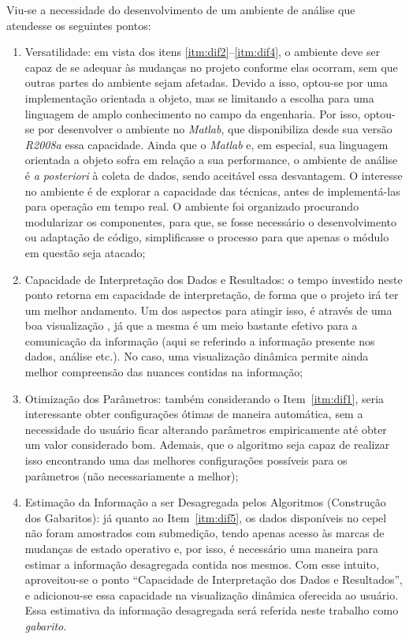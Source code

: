 Viu-se a necessidade do
desenvolvimento de um ambiente de análise que atendesse os seguintes
pontos:

\begin{enumerate}
\item Versatilidade: em vista dos itens
\ref{itm:dif2}--\ref{itm:dif4}, o ambiente deve ser capaz de se
adequar às mudanças no projeto conforme elas ocorram, sem que outras
partes do ambiente sejam afetadas. Devido a isso, optou-se por uma
implementação orientada a objeto, mas se limitando a escolha para uma
linguagem de amplo conhecimento no campo da engenharia. Por isso,
optou-se por desenvolver o ambiente no \emph{Matlab}, que
disponibiliza desde sua versão \emph{R2008a} essa capacidade.
Ainda que o \emph{Matlab} e, em especial, sua linguagem orientada a
objeto sofra em relação a sua performance, o ambiente de análise é
\emph{a posteriori} à coleta de dados, sendo aceitável essa
desvantagem. O interesse no ambiente é de explorar a capacidade das
técnicas, antes de implementá-las para operação em tempo real. O ambiente
foi organizado procurando modularizar os componentes, para que, se
fosse necessário o desenvolvimento ou adaptação de código,
simplificasse o processo para que apenas o módulo em questão seja 
atacado;

\item Capacidade de Interpretação dos Dados e Resultados: o tempo
investido neste ponto retorna em capacidade de interpretação, de forma
que o projeto irá ter um melhor andamento. Um dos aspectos para
atingir isso, é através de uma boa visualização \cite{it_depends}, já
que a mesma é um meio bastante efetivo para a comunicação da
informação (aqui se referindo a informação presente nos dados,
análise etc.). No caso, uma visualização dinâmica permite ainda melhor
compreensão das nuances contidas na informação;

\item Otimização dos Parâmetros: também considerando o
Item~\ref{itm:dif1}, seria interessante obter configurações ótimas de
maneira automática, sem a necessidade do usuário ficar alterando
parâmetros empiricamente até obter um valor considerado bom.
Ademais, que o algoritmo seja capaz de realizar isso encontrando uma
das melhores configurações possíveis para os parâmetros (não
necessariamente a melhor);

\item Estimação da Informação a ser Desagregada pelos Algoritmos
(Construção dos Gabaritos): já
quanto ao Item~\ref{itm:dif5}, os dados disponíveis no \acs{cepel} não
foram amostrados com submedição, tendo apenas acesso às marcas de
mudanças de estado operativo e, por isso, é necessário uma maneira para
estimar a informação desagregada contida nos mesmos. Com esse intuito,
aproveitou-se o ponto ``Capacidade de Interpretação dos Dados e
Resultados'', e adicionou-se essa capacidade na
visualização dinâmica oferecida ao usuário. Essa estimativa da
informação desagregada será referida neste trabalho como
\emph{gabarito}.

\end{enumerate}

